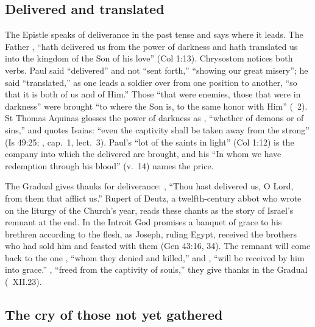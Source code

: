 \subsection{Delivered and translated}
\label{sec:body-epistle}

The Epistle speaks of deliverance in the past tense and says where it
leads. The Father , ``hath delivered us from the power of darkness
and hath translated us into the kingdom of the Son of his love'' (Col 1:13).
Chrysostom notices both verbs. Paul said ``delivered'' and not ``sent forth,''
``showing our great misery''; he said ``translated,'' as one leads a soldier
over from one position to another, ``so that it is both of us and of Him.''
Those ``that were enemies, those that were in darkness'' were brought ``to
where the Son is, to the same honor with Him'' (~2). St
Thomas Aquinas glosses the power of darkness as , ``whether of demons or of sins,'' and quotes Isaias: ``even the
captivity shall be taken away from the strong'' (Is 49:25; , cap.~1, lect.~3). Paul's ``lot of the saints in light'' (Col
1:12) is the company into which the delivered are brought, and his ``In whom
we have redemption through his blood'' (v.~14) names the price.

The Gradual gives thanks for deliverance: , ``Thou hast delivered us, O Lord, from them that afflict
us.'' Rupert of Deutz, a twelfth-century abbot who wrote on the liturgy of
the Church's year, reads these chants as the story of
Israel's remnant at the end.
In the Introit God promises a banquet of grace to his brethren according to
the flesh, as Joseph, ruling Egypt, received the brothers who had sold him and
feasted with them (Gen 43:16, 34). The remnant will come back to the one
, ``whom they denied and killed,'' and
, ``will be received by him into grace.''
, ``freed from the captivity of
souls,'' they give thanks in the Gradual (~XII.23).

\subsection{The cry of those not yet gathered}
\label{sec:body-depths}

